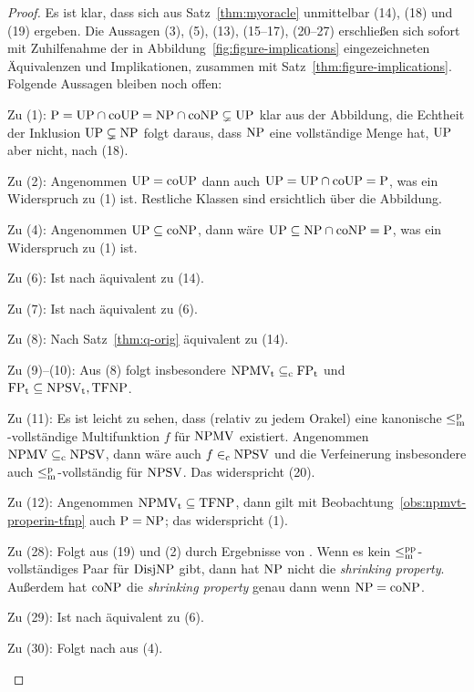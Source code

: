 \begin{proof}
Es ist klar, dass sich aus Satz~\ref{thm:myoracle} unmittelbar (14), (18) und (19) ergeben.
Die Aussagen (3), (5), (13), (15–17), (20–27) erschließen sich sofort mit Zuhilfenahme der in Abbildung~\ref{fig:figure-implications} eingezeichneten Äquivalenzen und Implikationen, zusammen mit Satz~\ref{thm:figure-implications}.
Folgende Aussagen bleiben noch offen:
\begin{prooflist}[nosep,midpenalty=0]
\item Zu (1): $\mathrm{P}=\mathrm{UP}\cap\mathrm{coUP}=\mathrm{NP}\cap\mathrm{coNP}\subsetneq\mathrm{UP}$ klar aus der Abbildung, die Echtheit der Inklusion $\mathrm{UP}\subsetneq\mathrm{NP}$ folgt daraus, dass $\mathrm{NP}$ eine vollständige Menge hat, $\mathrm{UP}$ aber nicht, nach (18).
\item Zu (2): Angenommen $\mathrm{UP}=\mathrm{coUP}$ dann auch $\mathrm{UP}=\mathrm{UP}\cap\mathrm{coUP}=\mathrm{P}$, was ein Widerspruch zu (1) ist. Restliche Klassen sind ersichtlich über die Abbildung.
\item Zu (4): Angenommen $\mathrm{UP}\subseteq\mathrm{coNP}$, dann wäre $\mathrm{UP}\subseteq \mathrm{NP}\cap\mathrm{coNP}=\mathrm{P}$, was ein Widerspruch zu (1) ist.
\item Zu (6): Ist nach \textcite[Thm.~4]{fenner_inverting_2003} äquivalent zu (14).
\item Zu (7): Ist nach \textcite[Thm.~14]{fenner_inverting_2003} äquivalent zu (6).
\item Zu (8): Nach Satz~\ref{thm:q-orig} äquivalent zu (14).
\item Zu (9)–(10): Aus (8) folgt insbesondere $\mathrm{NPMV_t}\subseteq_\mathrm{c} \mathrm{FP}_\mathrm{t}$ und $\mathrm{FP}_\mathrm{t}\subseteq \mathrm{NPSV_t}, \mathrm{TFNP}$.
\item Zu (11): Es ist leicht zu sehen, dass (relativ zu jedem Orakel) eine kanonische $\leq_\mathrm{m}^\mathrm{p}$-vollständige Multifunktion $f$ für $\mathrm{NPMV}$ existiert. Angenommen $\mathrm{NPMV} \subseteq_{\mathrm{c}} \mathrm{NPSV}$, dann wäre auch $f\in_\mathrm{c} \mathrm{NPSV}$ und die Verfeinerung insbesondere auch $\leq_\mathrm{m}^\mathrm{p}$-vollständig für $\mathrm{NPSV}$.
    Das widerspricht (20). 
\item Zu (12): Angenommen $\mathrm{NPMV_t}\subseteq \mathrm{TFNP}$, dann gilt mit Beobachtung~\ref{obs:npmvt-properin-tfnp} auch $\mathrm{P}=\mathrm{NP}$; das widerspricht (1).
\item Zu (28): Folgt aus (19) und (2) durch Ergebnisse von \textcite{glaser_shrinking_2011}. Wenn es kein $\leq_\mathrm{m}^\mathrm{pp}$-vollständiges Paar für $\mathrm{DisjNP}$ gibt, dann hat $\mathrm{NP}$ nicht die \emph{shrinking property}. Außerdem hat $\mathrm{coNP}$ die \emph{shrinking property} genau dann wenn $\mathrm{NP}=\mathrm{coNP}$.
\item Zu (29): Ist nach \textcite{glaser_shrinking_2011} äquivalent zu (6).
\item Zu (30): Folgt nach \textcite{glaser_shrinking_2011} aus (4).
\end{prooflist}
\end{proof}





